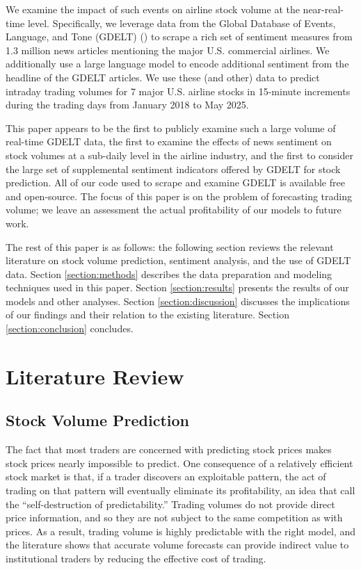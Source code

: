 \documentclass[12pt]{article}
\begin{document}
We examine the impact of such events on airline stock volume at the near-real-time level. Specifically, we leverage data from the Global Database of Events, Language, and Tone (GDELT) (\textcite{leetaru2013gdelt}) to scrape a rich set of sentiment measures from 1.3 million news articles mentioning the major U.S. commercial airlines. We additionally use a large language model to encode additional sentiment from the headline of the GDELT articles. We use these (and other) data to predict intraday trading volumes for 7 major U.S. airline stocks in 15-minute increments during the trading days from January 2018 to May 2025.

This paper appears to be the first to publicly examine such a large volume of real-time GDELT data, the first to examine the effects of news sentiment on stock volumes at a sub-daily level in the airline industry, and the first to consider the large set of supplemental sentiment indicators offered by GDELT for stock prediction. All of our code used to scrape and examine GDELT is available free and open-source. The focus of this paper is on the problem of forecasting trading volume; we leave an assessment the actual profitability of our models to future work.

The rest of this paper is as follows: the following section reviews the relevant literature on stock volume prediction, sentiment analysis, and the use of GDELT data. Section \ref{section:methods} describes the data preparation and modeling techniques used in this paper. Section \ref{section:results} presents the results of our models and other analyses. Section \ref{section:discussion} discusses the implications of our findings and their relation to the existing literature. Section \ref{section:conclusion} concludes.

\section{Literature Review}
\label{section:litreview}

\subsection{Stock Volume Prediction}
The fact that most traders are concerned with predicting stock prices makes stock prices nearly impossible to predict. One consequence of a relatively efficient stock market is that, if a trader discovers an exploitable pattern, the act of trading on that pattern will eventually eliminate its profitability, an idea that \textcite{timmermann2004efficient} call the ``self-destruction of predictability.'' Trading volumes do not provide direct price information, and so they are not subject to the same competition as with prices. As a result, trading volume is highly predictable with the right model, and the literature shows that accurate volume forecasts can provide indirect value to institutional traders by reducing the effective cost of trading.
\end{document}
